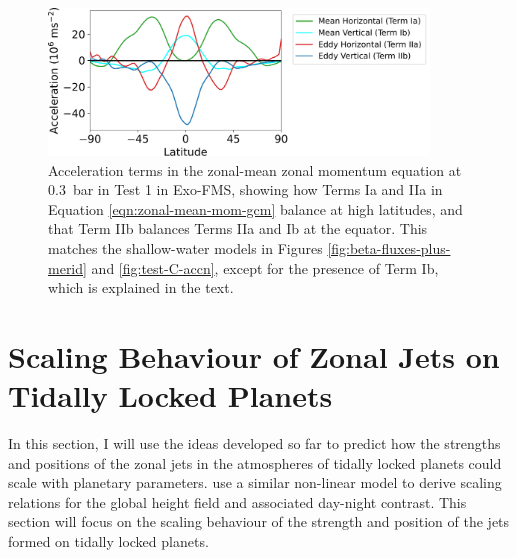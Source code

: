 


\begin{figure}
  \centering
  \includegraphics[width=0.9\textwidth]{figures/eqm-zonal-flow/accn-terms-jet-level.pdf}
  \caption{Acceleration terms in the zonal-mean zonal momentum equation at \SI{0.3}{\bar} in Test 1 in Exo-FMS, showing how Terms Ia and IIa in Equation \ref{eqn:zonal-mean-mom-gcm} balance at high latitudes, and that Term IIb balances Terms IIa and Ib at the equator. This matches the shallow-water models in Figures \ref{fig:beta-fluxes-plus-merid} and \ref{fig:test-C-accn}, except for the presence of Term Ib, which is explained in the text.}\label{fig:accn-terms-jet-level}
\end{figure}





\section{Scaling Behaviour of Zonal Jets on Tidally Locked Planets}

In this section, I will use the ideas developed so far to predict how the strengths and positions of the zonal jets in the atmospheres of tidally locked planets could scale with planetary parameters. \citet{perez2013atmospheric} use a similar non-linear model to derive scaling relations for the global height field and associated day-night contrast. This section will focus on the scaling behaviour of the strength and position of the jets formed on tidally locked planets.


